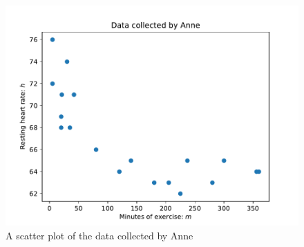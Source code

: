 \begin{figure}[!hbtp]
\begin{center}
\includegraphics[width=.7\textwidth]{./assets/data_collected_by_anne/main.pdf}
\end{center}
\caption{A scatter plot of the data collected by Anne}
\label{fig:data_collected_by_anne}
\end{figure}

